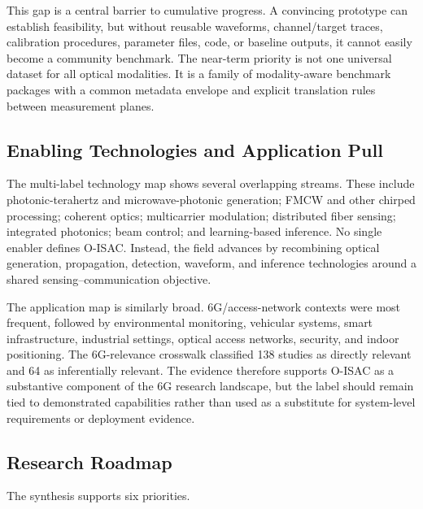 This gap is a central barrier to cumulative progress. A convincing prototype
can establish feasibility, but without reusable waveforms, channel/target
traces, calibration procedures, parameter files, code, or baseline outputs, it
cannot easily become a community benchmark. The near-term priority is not one
universal dataset for all optical modalities. It is a family of modality-aware
benchmark packages with a common metadata envelope and explicit translation
rules between measurement planes.

\subsection{Enabling Technologies and Application Pull}

The multi-label technology map shows several overlapping streams. These
include photonic-terahertz and microwave-photonic generation; FMCW and other
chirped processing; coherent optics; multicarrier modulation; distributed
fiber sensing; integrated photonics; beam control; and learning-based
inference. No single enabler defines O-ISAC. Instead, the field advances by
recombining optical generation, propagation, detection, waveform, and
inference technologies around a shared sensing--communication objective.

The application map is similarly broad. 6G/access-network contexts were most
frequent, followed by environmental monitoring, vehicular systems, smart
infrastructure, industrial settings, optical access networks, security, and
indoor positioning. The 6G-relevance crosswalk classified 138 studies as
directly relevant and 64 as inferentially relevant. The evidence therefore
supports O-ISAC as a substantive component of the 6G research landscape, but
the label should remain tied to demonstrated capabilities rather than used as
a substitute for system-level requirements or deployment evidence.

\subsection{Research Roadmap}

The synthesis supports six priorities.

